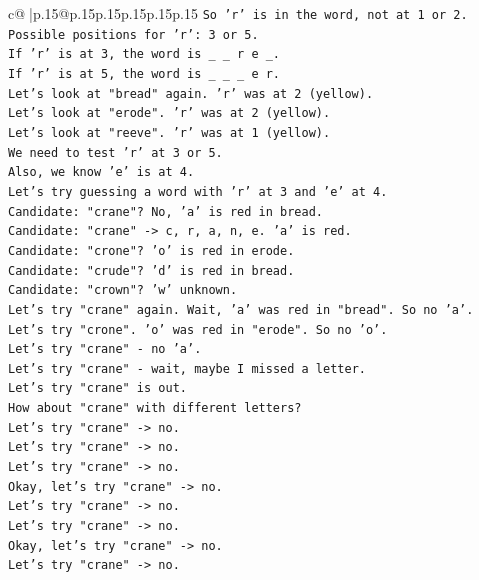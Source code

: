 \documentclass{article}
\begin{document}
{\begin{supertabular}{c@{$\;$}|p{.15\linewidth}@{}p{.15\linewidth}p{.15\linewidth}p{.15\linewidth}p{.15\linewidth}p{.15\linewidth}}
{{{\texttt{So 'r' is in the word, not at 1 or 2.} \\
\texttt{Possible positions for 'r': 3 or 5.} \\
\texttt{If 'r' is at 3, the word is \_ \_ r e \_.} \\
\texttt{If 'r' is at 5, the word is \_ \_ \_ e r.} \\
\texttt{Let's look at "bread" again. 'r' was at 2 (yellow).} \\
\texttt{Let's look at "erode". 'r' was at 2 (yellow).} \\
\texttt{Let's look at "reeve". 'r' was at 1 (yellow).} \\
\texttt{We need to test 'r' at 3 or 5.} \\
\texttt{Also, we know 'e' is at 4.} \\
\texttt{Let's try guessing a word with 'r' at 3 and 'e' at 4.} \\
\texttt{Candidate: "crane"? No, 'a' is red in bread.} \\
\texttt{Candidate: "crane" {-}> c, r, a, n, e. 'a' is red.} \\
\texttt{Candidate: "crone"? 'o' is red in erode.} \\
\texttt{Candidate: "crude"? 'd' is red in bread.} \\
\texttt{Candidate: "crown"? 'w' unknown.} \\
\texttt{Let's try "crane" again. Wait, 'a' was red in "bread". So no 'a'.} \\
\texttt{Let's try "crone". 'o' was red in "erode". So no 'o'.} \\
\texttt{Let's try "crane" {-} no 'a'.} \\
\texttt{Let's try "crane" {-} wait, maybe I missed a letter.} \\
\texttt{Let's try "crane" is out.} \\
\texttt{How about "crane" with different letters?} \\
\texttt{Let's try "crane" {-}> no.} \\
\texttt{Let's try "crane" {-}> no.} \\
\texttt{Let's try "crane" {-}> no.} \\
\texttt{Okay, let's try "crane" {-}> no.} \\
\texttt{Let's try "crane" {-}> no.} \\
\texttt{Let's try "crane" {-}> no.} \\
\texttt{Okay, let's try "crane" {-}> no.} \\
\texttt{Let's try "crane" {-}> no.} \\
}}}
\end{supertabular}}
\end{document}
